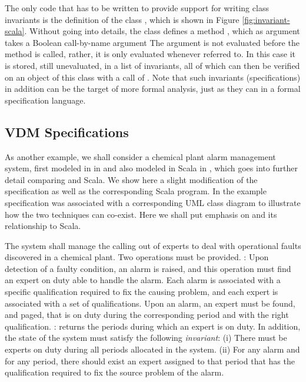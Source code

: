 The only code that has to be written to provide support for 
writing
class invariants is the definition of the class , 
which is shown in Figure \ref{fig:invariant-scala}. Without going 
into details, the class defines a method ,
which as argument takes a Boolean call-by-name argument 
The argument is not evaluated before the method is called, 
rather, it is only evaluated whenever referred to. In this case
it is stored, still unevaluated, in a list of invariants, all
of which can then be verified on an object of this class 
with a call of . Note that such invariants
(specifications) in addition can be the target of more formal analysis, just as they can in a formal specification language.


\subsection{VDM Specifications}
\label{sec:vdm-in-scala}

As another example, we shall consider a chemical plant alarm 
management system, first modeled in \vdmpp{} in 
\cite{vdmplusplus05} and also modeled in Scala in 
\cite{havelund-scala-vdm-12}, which goes into further detail comparing \vdmpp{} and Scala. We show here a slight modification of 
the \vdmpp{} specification as well as the 
corresponding Scala program. In \cite{vdmplusplus05}
the example specification was associated with 
a corresponding UML class diagram to illustrate how the two
techniques can co-exist. Here we shall put emphasis on
\vdmpp{} and its relationship to Scala.

The system shall manage the calling out of experts to deal with 
operational faults discovered in a 
chemical plant. 
Two operations must be provided.
: Upon detection of a faulty condition, an 
alarm is raised, and this operation must find an expert on duty 
able to handle the alarm. Each alarm is associated with a specific 
qualification required to fix the causing
problem, and each expert is associated with a set of 
qualifications. Upon an alarm, an expert must be found, and paged, 
that is on duty during the corresponding period and with the right 
qualification.    
: returns the periods during 
which an expert is on duty.      
In addition, the state of the system must satisfy the following
{\em invariant}:
(i) There must be experts on duty during all periods 
allocated in the system. 
(ii) For any alarm and for any period, there should exist an 
expert assigned to that period that has the qualification required
to fix the source problem of the alarm.


